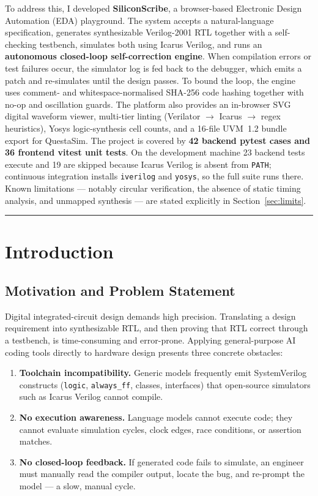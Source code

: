 \documentclass[11pt,a4paper]{article}
\newcommand{\abstractrule}{\noindent\rule{\textwidth}{0.8pt}\par\vspace{3pt}}
\begin{document}
To address this, I developed \textbf{SiliconScribe}, a browser-based Electronic
Design Automation (EDA) playground. The system accepts a natural-language
specification, generates synthesizable Verilog-2001 RTL together with a
self-checking testbench, simulates both using Icarus Verilog, and runs an
\textbf{autonomous closed-loop self-correction engine}. When compilation errors or
test failures occur, the simulator log is fed back to the debugger, which emits a
patch and re-simulates until the design passes. To bound the loop, the engine uses
comment- and whitespace-normalised SHA-256 code hashing together with
no-op and oscillation guards. The platform also provides an in-browser SVG digital
waveform viewer, multi-tier linting (Verilator $\rightarrow$ Icarus $\rightarrow$
regex heuristics), Yosys logic-synthesis cell counts, and a 16-file UVM~1.2 bundle
export for QuestaSim. The project is covered by \textbf{42 backend pytest cases and
36 frontend vitest unit tests}. On the development machine 23 backend tests execute
and 19 are skipped because Icarus Verilog is absent from \texttt{PATH}; continuous
integration installs \texttt{iverilog} and \texttt{yosys}, so the full suite runs
there. Known limitations --- notably circular verification, the absence of static
timing analysis, and unmapped synthesis --- are stated explicitly in
Section~\ref{sec:limits}.

\abstractrule
\clearpage

\section{Introduction}
\label{sec:intro}

\subsection{Motivation and Problem Statement}
Digital integrated-circuit design demands high precision. Translating a design
requirement into synthesizable RTL, and then proving that RTL correct through a
testbench, is time-consuming and error-prone. Applying general-purpose AI coding
tools directly to hardware design presents three concrete obstacles:

\begin{enumerate}[label=\textbf{\arabic*.}]
\item \textbf{Toolchain incompatibility.} Generic models frequently emit
SystemVerilog constructs (\texttt{logic}, \texttt{always\_ff}, classes,
interfaces) that open-source simulators such as Icarus Verilog cannot compile.
\item \textbf{No execution awareness.} Language models cannot execute code; they
cannot evaluate simulation cycles, clock edges, race conditions, or assertion
matches.
\item \textbf{No closed-loop feedback.} If generated code fails to simulate, an
engineer must manually read the compiler output, locate the bug, and re-prompt the
model --- a slow, manual cycle.
\end{enumerate}
\end{document}
